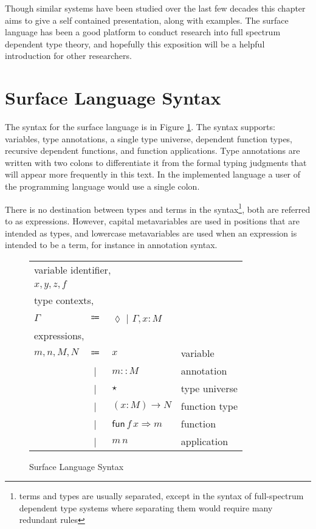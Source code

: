 Though similar systems have been studied over the last few decades this chapter aims to give a self contained presentation, along with examples.
The surface language has been a good platform to conduct research into full spectrum dependent type theory, and hopefully this exposition will be a helpful introduction for other researchers.

\section{Surface Language Syntax}


The syntax for the surface language is in Figure \ref{fig:surface-pre-syntax}.
The syntax supports: variables, type annotations, a single type universe, dependent function types, recursive dependent functions, and function applications.
Type annotations are written with two colons to differentiate it from the formal typing judgments that will appear more frequently in this text. In the implemented language a user of the programming language would use a single colon.


There is no destination between types and terms in the syntax\footnote{terms and types are usually separated, except in the syntax of full-spectrum dependent type systems where separating them would require many redundant rules}, both are referred to as expressions.
However, capital metavariables are used in positions that are intended as types, and lowercase metavariables are used when an expression is intended to be a term, for instance in annotation syntax.






\begin{figure}
  \begin{tabular}{lcll}
  \multicolumn{4}{l}{variable identifier,}\tabularnewline
  \multicolumn{4}{l}{$x,y,z,f$}\tabularnewline
  \multicolumn{4}{l}{type contexts,}\tabularnewline
  $\Gamma$ & $\Coloneqq$ & $\lozenge$ | $\Gamma,x:M$ & \tabularnewline
  \multicolumn{4}{l}{expressions,}\tabularnewline
  $m,n,M,N$ & $\Coloneqq$ & $x$ & variable\tabularnewline
   & | & $m::M$ & annotation\tabularnewline
   & | & $\star$ & type universe\tabularnewline
   & | & $\left(x:M\right)\rightarrow N$ & function type\tabularnewline
   & | & $\mathsf{fun}\,f\,x\Rightarrow m$ & function\tabularnewline
   & | & $m\,n$ & application\tabularnewline
  \end{tabular}\caption{Surface Language Syntax}
  \label{fig:surface-pre-syntax}
  \end{figure}
  
